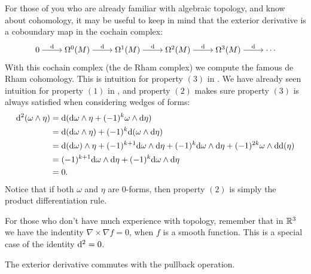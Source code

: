 \documentclass[11pt,a4paper]{article}
\begin{document}
\begin{remark}
  For those of you who are already familiar with algebraic topology,
  and know about cohomology,
  it may be useful to keep in mind that the exterior derivative
  is a coboundary map in the cochain complex:
  \[\begin{tikzcd}[ampersand replacement=\&,cramped]
    0 \& {\Omega^0(M)} \& {\Omega^1(M)} \& {\Omega^2(M)} \& {\Omega^3(M)} \& \cdots
    \arrow["\dif", from=1-1, to=1-2]
    \arrow["\dif", from=1-2, to=1-3]
    \arrow["\dif", from=1-3, to=1-4]
    \arrow["\dif", from=1-4, to=1-5]
    \arrow["\dif", from=1-5, to=1-6]
  \end{tikzcd}\]
  With this cochain complex (the de Rham complex)
  we compute the famous de Rham cohomology.
  This is intuition for 
  property $(3)$ in .
  We have already seen intuition for property $(1)$
  in ,
  and property $(2)$ makes sure property $(3)$ is always satisfied
  when considering wedges of forms:
  \begin{align*}
    \mathrm{d}^2(\omega \wedge \eta) &=
      \mathrm{d}(\mathrm{d} \omega \wedge \eta + (-1)^k \omega \wedge \mathrm{d} \eta) \\ &=
    \mathrm{d}(\mathrm{d} \omega \wedge \eta) + (-1)^k \mathrm{d}(\omega \wedge \mathrm{d} \eta) \\ &=
    \mathrm{d}(\mathrm{d} \omega) \wedge \eta + (-1)^{k+1} \mathrm{d} \omega \wedge \mathrm{d} \eta +
    (-1)^k \mathrm{d} \omega \wedge \mathrm{d} \eta +
    (-1)^{2k} \omega \wedge \mathrm{d} \mathrm{d}(\eta) \\ &=
    (-1)^{k+1} \mathrm{d} \omega \wedge \mathrm{d} \eta +
    (-1)^k \mathrm{d} \omega \wedge \mathrm{d} \eta \\ &= 0.
  \end{align*}
  Notice that if both $\omega$ and $\eta$ are $0$-forms,
  then property $(2)$ is simply the product differentiation rule.
\end{remark}
\begin{remark}
  \label{rmk:curl-of-gradient-is-zero}
  For those who don't have much experience with topology,
  remember that in $\mathbb{R}^3$ we have 
  the indentity $\nabla \times \nabla f = 0$,
  when $f$ is a smooth function.
  This is a special case of the identity $\mathrm{d}^2 = 0$.
\end{remark}

\begin{remark}
  \label{rmk:ext-der-pullback-commute}
  The exterior derivative commutes with the pullback operation.
\end{remark}
\end{document}
